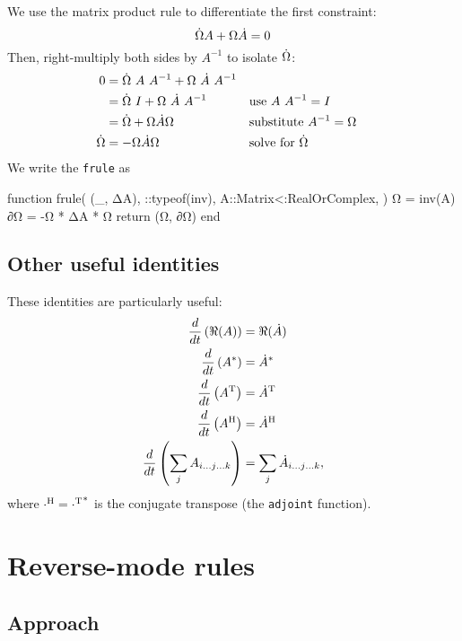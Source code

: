 \documentclass[../main.tex]{subfiles}
\begin{document}
\begin{refsection}
We use the matrix product rule to differentiate the first constraint:
\[\dot{\Omega} A + \Omega \dot{A} = 0\]
Then, right-multiply both sides by $A^{-1}$ to isolate $\dot{\Omega}$:
\begin{align}
0  &= \dot{\Omega}~ A~ A^{-1} + \Omega ~\dot{A}~ A^{-1} \nonumber\\
   &= \dot{\Omega}~ I + \Omega ~\dot{A}~ A^{-1}
       && \text{use } A~ A^{-1} = I \nonumber\\
   &= \dot{\Omega} + \Omega \dot{A} \Omega
       && \text{substitute } A^{-1} = \Omega \nonumber\\
\dot{\Omega}
   &= -\Omega \dot{A} \Omega
       && \text{solve for } \dot{\Omega} \label{invdiff}
\end{align}
We write the \texttt{frule} as
\begin{juliacode}
function frule(
    (_, ΔA),
    ::typeof(inv),
    A::Matrix{<:RealOrComplex},
)
    Ω = inv(A)
    ∂Ω = -Ω * ΔA * Ω
    return (Ω, ∂Ω)
end
\end{juliacode}
\subsection{Other useful identities}\label{other-useful-identities}

These identities are particularly useful:
\begin{align*}
\frac{d}{dt} \left( \Re(A) \right) &= \Re(\dot{A})\\
\frac{d}{dt} \left( {A}^* \right) &= {\dot{A}}^*\\
\frac{d}{dt} \left( {A}^\mathrm{T} \right) &= {\dot{A}}^\mathrm{T}\\
\frac{d}{dt} \left( {A}^\mathrm{H} \right) &= {\dot{A}}^\mathrm{H}\\
\frac{d}{dt} \left( \sum_{j}  A_{i \ldots j \ldots k} \right) &=
    \sum_{j} \dot{A}_{i \ldots j \ldots k},
\end{align*}
where ${\cdot}^\mathrm{H} = {{\cdot}^\mathrm{T}}^*$ is the conjugate transpose (the \texttt{adjoint} function).

\section{Reverse-mode rules}\label{reverse-mode-rules}

\subsection{Approach}\label{approach-1}


\end{refsection}
\end{document}
